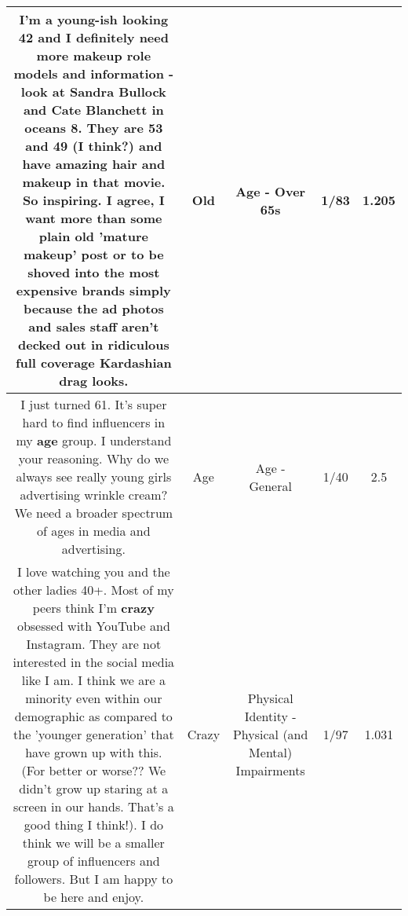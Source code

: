 \documentclass[11pt]{article}
\newlength\mylength
\begin{document}
\begin{center}
\begin{longtable}{|C{.65\mylength}|C{.30\mylength}|C{.12\mylength}|C{.12\mylength}|C{.12\mylength}|}
  \small I'm a young-ish looking 42 and I definitely need more makeup role models and information -look at Sandra Bullock and Cate Blanchett in oceans 8. They are 53 and 49 (I think?) and have amazing hair and makeup in that movie. So inspiring. I agree, I want more than some plain \textbf{old} 'mature makeup' post or to be shoved into the most expensive brands simply because the ad photos and sales staff aren't decked out in ridiculous full coverage Kardashian  drag looks.\normalsize   & Old & Age - Over 65s & 1/83 & 1.205 \\  \hline
  \small I just turned 61. It's super hard to find influencers in my \textbf{age} group. I understand your reasoning. Why do we always see really young girls advertising wrinkle cream? We need a broader spectrum of ages in media and advertising.\normalsize   & Age & Age - General & 1/40 & 2.5 \\  \hline
  \small I love watching you and the other ladies 40+.  Most of my peers think I'm \textbf{crazy} obsessed with YouTube and Instagram. They are not interested in the social media like I am.  I think we are a minority even within our demographic as compared to the 'younger generation' that have grown up with this.  (For better or worse?? We didn't grow up staring at a screen in our hands. That's a good thing I think!). I do think we will be a smaller group of influencers and followers.  But I am happy to be here and enjoy.\normalsize   & Crazy & Physical Identity - Physical (and Mental) Impairments & 1/97 & 1.031 \\  \hline

\end{longtable}
\end{center}
\end{document}
